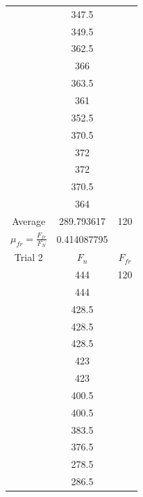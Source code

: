 \documentclass[12pt]{article}
\begin{document}
\begin{table}
\begin{tabular}[t]{| c  c  c |}
                & 347.5         &           \\
                & 349.5         &           \\
                & 362.5         &           \\
                & 366           &           \\
                & 363.5         &           \\
                & 361           &           \\
                & 352.5         &           \\
                & 370.5         &           \\
                & 372           &           \\
                & 372           &           \\
                & 370.5         &           \\
                & 364           &           \\
        \hline
        Average & 289.793617    & 120       \\
        \hline
        $\mu_{fr} = \frac{F_{fr}}{F_{N}}$ & 0.414087795 & \\
        \hline
        \hline
        Trial 2 & $F_{n}$       & $F_{fr}$  \\
        \hline
                & 444           & 120       \\
                & 444           &           \\
                & 428.5         &           \\
                & 428.5         &           \\
                & 428.5         &           \\
                & 423           &           \\
                & 423           &           \\
                & 400.5         &           \\
                & 400.5         &           \\
                & 383.5         &           \\
                & 376.5         &           \\
                & 278.5         &           \\
                & 286.5         &           \\
        \hline
    \end{tabular}
    \begin{tabular}[t]{| c  c  c |}

\end{tabular}
\end{table}
\end{document}
